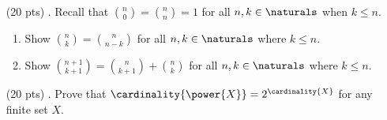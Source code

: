 \begin{enumerate}
  \item[(20 pts) \quad 5.]
    Recall that $\binom{n}{0} = \binom{n}{n} = 1$ for all $n, k \in \naturals$ when $k \leq n$.
    \begin{enumerate}
      \item
        Show $\binom{n}{k} = \binom{n}{n - k}$ for all $n, k \in \naturals$ where $k \leq n$.

      \item
        Show $\binom{n + 1}{k + 1} = \binom{n}{k + 1} + \binom{n}{k}$ for all $n, k \in \naturals$ where $k \leq n$.

    \end{enumerate}

  \item[(20 pts) \quad 6.]
    Prove that $\cardinality{\power{X}} = 2^{\cardinality{X}}$ for any finite set $X$.

\end{enumerate}


